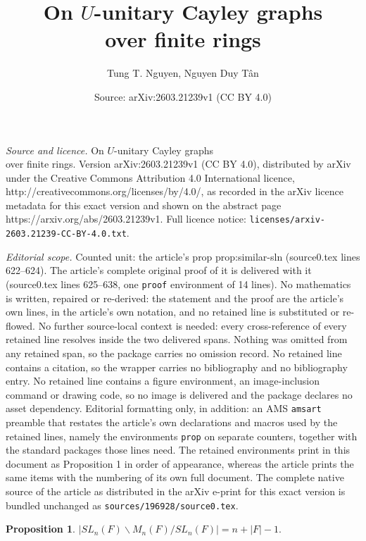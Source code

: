 \documentclass[10pt,a4paper]{amsart}
\title{On $U$-unitary Cayley graphs \\ over finite rings}
\author{Tung T. Nguyen, Nguyen Duy T\^an}
\date{Source: arXiv:2603.21239v1 (CC BY 4.0)}
\newtheorem{prop}{Proposition}
\begin{document}
\maketitle

\noindent\emph{Source and licence.} On $U$-unitary Cayley graphs \\ over finite rings. Version arXiv:2603.21239v1 (CC BY 4.0), distributed by arXiv under the Creative Commons Attribution 4.0 International licence, http://creativecommons.org/licenses/by/4.0/, as recorded in the arXiv licence metadata for this exact version and shown on the abstract page https://arxiv.org/abs/2603.21239v1. Full licence notice: \texttt{licenses/arxiv-2603.21239-CC-BY-4.0.txt}.\par\smallskip

\noindent\textit{Editorial scope.} Counted unit: the article's prop prop:similar-sln (source0.tex lines 622--624). The article's complete original proof of it is delivered with it (source0.tex lines 625--638, one \texttt{proof} environment of 14 lines). No mathematics is written, repaired or re-derived: the statement and the proof are the article's own lines, in the article's own notation, and no retained line is substituted or re-flowed.  No further source-local context is needed: every cross-reference of every retained line resolves inside the two delivered spans.  Nothing was omitted from any retained span, so the package carries no omission record.  No retained line contains a citation, so the wrapper carries no bibliography and no bibliography entry.  No retained line contains a figure environment, an image-inclusion command or drawing code, so no image is delivered and the package declares no asset dependency.  Editorial formatting only, in addition: an AMS \texttt{amsart} preamble that restates the article's own declarations and macros used by the retained lines, namely the environments \texttt{prop} on separate counters, together with the standard packages those lines need.  The retained environments print in this document as Proposition 1 in order of appearance, whereas the article prints the same items with the numbering of its own full document.  The complete native source of the article as distributed in the arXiv e-print for this exact version is bundled unchanged as \texttt{sources/196928/source0.tex}.
\begin{prop} \label{prop:similar-sln}
    $|SL_n(F) \backslash M_n(F) \slash SL_n(F)|=n+|F|-1.$
\end{prop}
\end{document}
